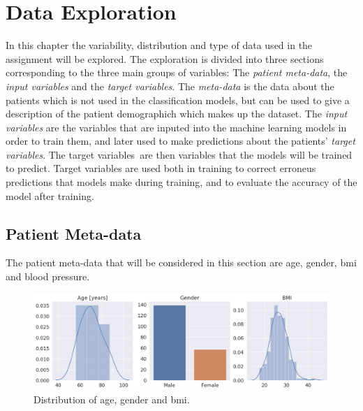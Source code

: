 \chapter{Data Exploration} \label{chap:data}

In this chapter the variability, distribution and type of data used in the assignment will be explored. 
The exploration is divided into three sections corresponding to the three main groups of variables: 
The \textit{patient meta-data}, the \textit{input variables} and the \textit{target variables}. 
The \textit{meta-data} is the data about the patients which is not used in the classification models, 
but can be used to give a description of the patient demographich which makes up the dataset. 
The \textit{input variables} are the variables that are inputed into the machine learning models in order to train them, 
and later used to make predictions about the patients' \textit{target variables}. 
The target variables are then variables that the models will be trained to predict. 
Target variables are used both in training to correct erroneus predictions that models make during training, and to evaluate the accuracy of the model after training. \bigskip

\section{Patient Meta-data} \label{sec:metadata}
The patient meta-data that will be considered in this section are age, gender, \acrfull{bmi} and blood pressure.

\begin{figure}
    \begin{center}
    \includegraphics[width=\textwidth]{data-exp/metadataDist4.png}
    \end{center}
    \caption{Distribution of age, gender and \acrshort{bmi}.}
    \label{fig:meta-dist4}
\end{figure}

